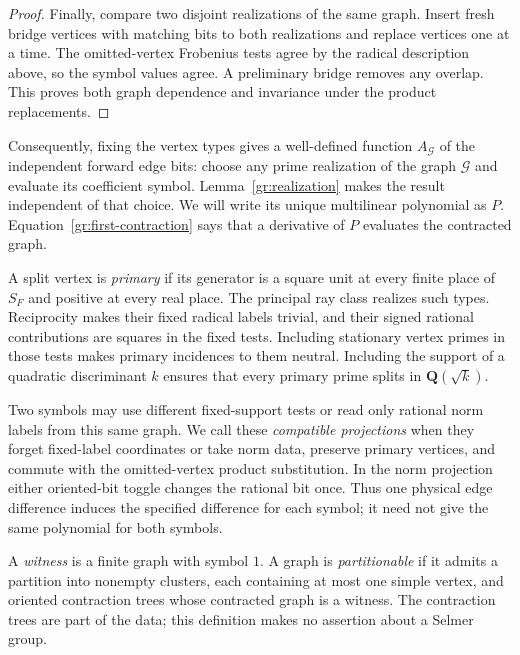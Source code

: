 \begin{proof}
Finally, compare two disjoint realizations of the same graph.  Insert
fresh bridge vertices with matching bits to both realizations and replace
vertices one at a time.  The omitted-vertex Frobenius tests agree by the
radical description above, so the symbol values agree.  A preliminary
bridge removes any overlap.  This proves both graph dependence and
invariance under the product replacements.
\end{proof}

Consequently, fixing the vertex types gives a well-defined function
$A_{\mathcal G}$ of the independent forward edge bits: choose any prime
realization of the graph $\mathcal G$ and evaluate its coefficient
symbol. Lemma~\ref{gr:realization} makes the result independent of that
choice. We will write its unique multilinear polynomial as $P$.
Equation~\eqref{gr:first-contraction} says that a derivative of $P$
evaluates the contracted graph.

A split vertex is \emph{primary} if its generator is a square unit at
every finite place of $S_F$ and positive at every real place.  The principal
ray class realizes such types.  Reciprocity makes their fixed radical
labels trivial, and their signed rational contributions are squares in the
fixed tests.  Including stationary vertex primes in those tests makes
primary incidences to them neutral.  Including the support of a quadratic
discriminant $k$ ensures that every primary prime splits in
$\mathbf Q(\sqrt{k})$.

Two symbols may use different fixed-support tests or read only rational
norm labels from this same graph. We call these \emph{compatible
projections} when they forget fixed-label coordinates or take norm data,
preserve primary vertices, and commute with the
omitted-vertex product substitution. In the norm projection either
oriented-bit toggle changes the rational bit once. Thus one physical
edge difference induces the specified difference for each symbol; it
need not give the same polynomial for both symbols.

\begin{definition}\label{gr:partitionable}
A \emph{witness} is a finite graph with symbol $1$.  A graph is
\emph{partitionable} if it admits a partition into nonempty clusters, each
containing at most one simple vertex, and oriented contraction trees whose
contracted graph is a witness.  The contraction trees are part of the data;
this definition makes no assertion about a Selmer group.
\end{definition}

